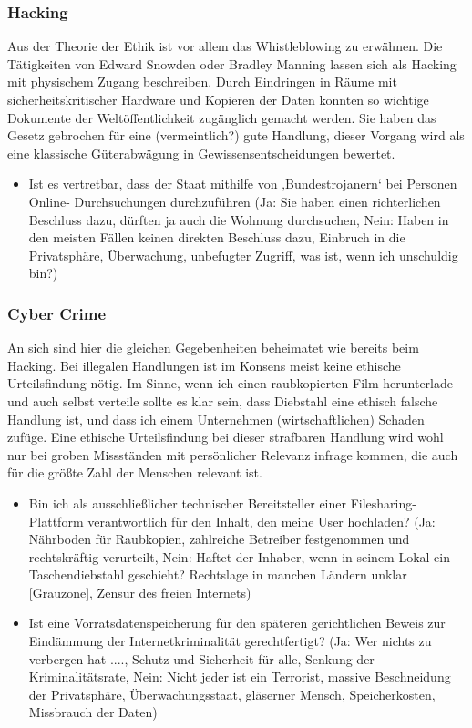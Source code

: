 \documentclass[letterpaper, 12pt]{article}
\let\tempsubsubsection\subsubsection
\renewcommand\subsubsection[1]{\vspace{0cm}\tempsubsubsection{#1}\vspace{0cm}}
\begin{document}
\subsubsection{Hacking}

Aus der Theorie der Ethik ist vor allem das Whistleblowing zu
erwähnen. Die Tätigkeiten von Edward Snowden oder Bradley Manning lassen sich als Hacking mit
physischem Zugang beschreiben. Durch Eindringen in Räume mit sicherheitskritischer Hardware und
Kopieren der Daten konnten so wichtige Dokumente der Weltöffentlichkeit zugänglich gemacht
werden. Sie haben das Gesetz gebrochen für eine (vermeintlich?) gute Handlung, dieser Vorgang
wird als eine klassische Güterabwägung in Gewissensentscheidungen bewertet.

\begin{itemize}
	\item Ist es vertretbar, dass der Staat mithilfe von ‚Bundestrojanern‘ bei Personen Online-
Durchsuchungen durchzuführen
(Ja: Sie haben einen richterlichen Beschluss dazu, dürften ja auch die Wohnung durchsuchen,
Nein: Haben in den meisten Fällen keinen direkten Beschluss dazu, Einbruch in die
Privatsphäre, Überwachung, unbefugter Zugriff, was ist, wenn ich unschuldig bin?)
\end{itemize}

\clearpage

\subsubsection{Cyber Crime}

An sich sind hier die gleichen Gegebenheiten beheimatet wie bereits beim Hacking. Bei illegalen
Handlungen ist im Konsens meist keine ethische Urteilsfindung nötig. Im Sinne, wenn ich einen
raubkopierten Film herunterlade und auch selbst verteile sollte es klar sein, dass Diebstahl eine
ethisch falsche Handlung ist, und dass ich einem Unternehmen (wirtschaftlichen) Schaden zufüge.
Eine ethische Urteilsfindung bei dieser strafbaren Handlung wird wohl nur bei groben Missständen
mit persönlicher Relevanz infrage kommen, die auch für die größte Zahl der Menschen relevant ist.

\begin{itemize}
	\item Bin ich als ausschließlicher technischer Bereitsteller einer Filesharing-Plattform
verantwortlich für den Inhalt, den meine User hochladen?
(Ja: Nährboden für Raubkopien, zahlreiche Betreiber festgenommen und rechtskräftig
verurteilt,
Nein: Haftet der Inhaber, wenn in seinem Lokal ein Taschendiebstahl geschieht? Rechtslage
in manchen Ländern unklar [Grauzone], Zensur des freien Internets)
	\item Ist eine Vorratsdatenspeicherung für den späteren gerichtlichen Beweis zur Eindämmung der
Internetkriminalität gerechtfertigt?
(Ja: Wer nichts zu verbergen hat ...., Schutz und Sicherheit für alle, Senkung der
Kriminalitätsrate,
Nein: Nicht jeder ist ein Terrorist, massive Beschneidung der Privatsphäre,
Überwachungsstaat, gläserner Mensch, Speicherkosten, Missbrauch der Daten)
\end{itemize}
\end{document}
